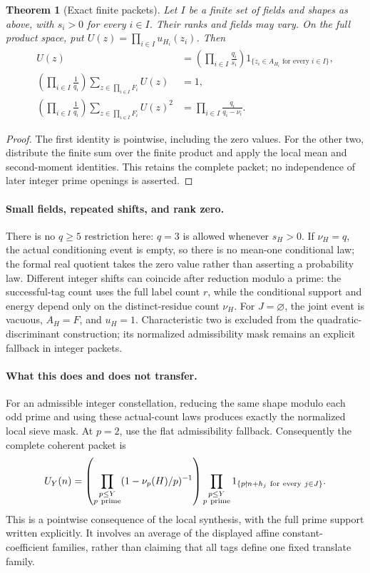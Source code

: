 \documentclass[11pt]{article}
\newtheorem{theorem}{Theorem}[section]
\begin{document}
\begin{theorem}[Exact finite packets]\label{thm:constellationFlatPacket}
Let \(I\) be a finite set of fields and shapes as above, with
\(s_i>0\) for every \(i\in I\). Their ranks and fields may vary.
On the full product space, put
\(U(z)=\prod_{i\in I}u_{H_i}(z_i)\). Then
\begin{align}
 U(z)&=\left(\prod_{i\in I}\frac{q_i}{s_i}\right)
              1_{\{z_i\in A_{H_i}\text{ for every }i\in I\}},\\
 \left(\prod_{i\in I}\frac1{q_i}\right)
       \sum_{z\in\prod_{i\in I}F_i}U(z)&=1,\\
 \left(\prod_{i\in I}\frac1{q_i}\right)
       \sum_{z\in\prod_{i\in I}F_i}U(z)^2
                   &=\prod_{i\in I}\frac{q_i}{q_i-\nu_i}.
\end{align}
\end{theorem}

\begin{proof}
The first identity is pointwise, including the zero values.
For the other two, distribute the finite sum over the finite product
and apply the local mean and second-moment identities. This retains
the complete packet; no independence of later integer prime openings
is asserted.
\end{proof}

\paragraph{Small fields, repeated shifts, and rank zero.}
There is no \(q\geq5\) restriction here: \(q=3\) is allowed whenever
\(s_H>0\). If \(\nu_H=q\), the actual conditioning event is empty,
so there is no mean-one conditional law; the formal real quotient
takes the zero value rather than asserting a probability law.
Different integer shifts can coincide after reduction modulo a prime:
the successful-tag count uses the full label count \(r\), while the
conditional support and energy depend only on the distinct-residue
count \(\nu_H\). For \(J=\varnothing\), the joint event is vacuous,
\(A_H=F\), and \(u_H=1\). Characteristic two is excluded from the
quadratic-discriminant construction; its normalized admissibility
mask remains an explicit fallback in integer packets.

\paragraph{What this does and does not transfer.}
For an admissible integer constellation, reducing the same shape modulo
each odd prime and using these actual-count laws produces exactly the
normalized local sieve mask. At \(p=2\), use the flat admissibility
fallback. Consequently the complete coherent packet is
\[
 U_Y(n)=
 \left(\prod_{\substack{p\leq Y\\p\ {\rm prime}}}
           (1-\nu_p(H)/p)^{-1}\right)
 \prod_{\substack{p\leq Y\\p\ {\rm prime}}}
           1_{\{p\nmid n+h_j\ {\rm for\ every}\ j\in J\}}.
\]
This is a pointwise consequence of the local synthesis, with the full
prime support written explicitly. It involves an average of the
displayed affine constant-coefficient families, rather than claiming
that all tags define one fixed translate family.
\end{document}

